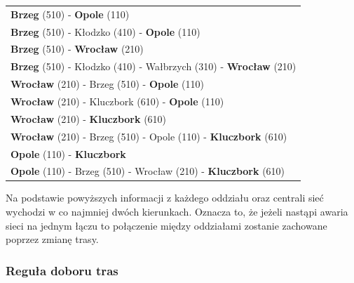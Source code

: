 \documentclass[a4paper]{article}
\begin{document}
\begin{table}[H]
\begin{tabular}{l}
        \hline
        \textbf{Brzeg} (510) - \textbf{Opole} (110)\\
		\textbf{Brzeg} (510) - Kłodzko (410) - \textbf{Opole} (110)\\
        \hline
        \textbf{Brzeg} (510) - \textbf{Wrocław} (210) \\ 
		\textbf{Brzeg} (510) - Kłodzko (410) - Wałbrzych (310) - \textbf{Wrocław} (210)\\
        \hline
        \textbf{Wrocław} (210) - Brzeg (510) - \textbf{Opole} (110) \\
        \textbf{Wrocław} (210) - Kluczbork (610) - \textbf{Opole} (110) \\
        \hline
        \textbf{Wrocław} (210) - \textbf{Kluczbork} (610) \\ 
        \textbf{Wrocław} (210) - Brzeg (510) - Opole (110) - \textbf{Kluczbork} (610) \\
        \hline
        \textbf{Opole} (110) - \textbf{Kluczbork} \\
        \textbf{Opole} (110) - Brzeg (510) - Wrocław (210) - \textbf{Kluczbork} (610) \\   
        \hline
	\end{tabular}
\end{table}

Na podstawie powyższych informacji z każdego oddziału oraz centrali sieć wychodzi w co najmniej dwóch kierunkach. Oznacza to, że jeżeli nastąpi awaria sieci na jednym łączu to połączenie między oddziałami zostanie zachowane poprzez zmianę trasy.

\subsubsection{Reguła doboru tras}
\end{document}
